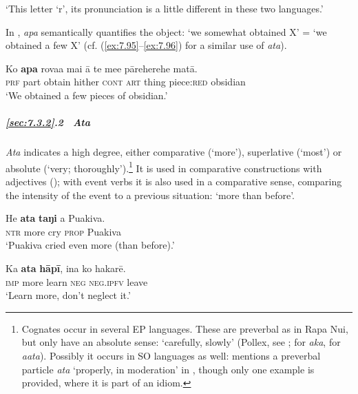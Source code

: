 \glt
‘This letter ‘r’, its pronunciation is a little different in these two languages.’ \textstyleExampleref{[R616.145]} 
\z

In , \textit{{\ꞌ}apa} semantically quantifies the object: ‘we somewhat obtained X’ = ‘we obtained a few X’ (cf. (\ref{ex:7.95}–\ref{ex:7.96}) for a similar use of \textit{{\ꞌ}ata}).

\ea\label{ex:7.91}
\gll Ko \textbf{{\ꞌ}apa} rova{\ꞌ}a mai {\ꞌ}ā te me{\ꞌ}e pāreherehe matā. \\
\textsc{prf} part obtain hither \textsc{cont} \textsc{art} thing piece:\textsc{red} obsidian \\

\glt 
‘We obtained a few pieces of obsidian.’ \textstyleExampleref{[R629.030]} 
\z

\subparagraph{\ref{sec:7.3.2}.2~ \textit{{\ꞌ}Ata}} \textit{{\ꞌ}Ata} indicates a high degree, either comparative (‘more’), superlative (‘most’) or absolute (‘very; thoroughly’).\footnote{\label{fn:343}Cognates occur in several EP languages. These are preverbal as in Rapa Nui, but only have an absolute sense: ‘carefully, slowly’ (Pollex, see \citealt{GreenhillClark2011}; \citealt[74]{ElbertPukui1979} for  \textit{aka}, \citealt[92]{Bauer1993} for  \textit{aata}). Possibly it occurs in SO languages as well: \citet[188]{Besnier2000} mentions a preverbal particle \textit{ata} ‘properly, in moderation’ in , though only one example is provided, where it is part of an idiom.} It is used in comparative constructions with adjectives (); with event verbs it is also used in a comparative sense, comparing the intensity of the event to a previous situation: ‘more than before’.

\ea\label{ex:7.92}
\gll He \textbf{{\ꞌ}ata} \textbf{taŋi} a Puakiva. \\
\textsc{ntr} more cry \textsc{prop} Puakiva \\

\glt 
‘Puakiva cried even more (than before).’ \textstyleExampleref{[R229.183]} 
\z

\ea\label{ex:7.93}
\gll Ka \textbf{{\ꞌ}ata} \textbf{hāpī}, {\ꞌ}ina ko hakarē. \\
\textsc{imp} more learn \textsc{neg} \textsc{neg.ipfv} leave \\

\glt
‘Learn more, don’t neglect it.’ \textstyleExampleref{[R242.093]} 
\z

